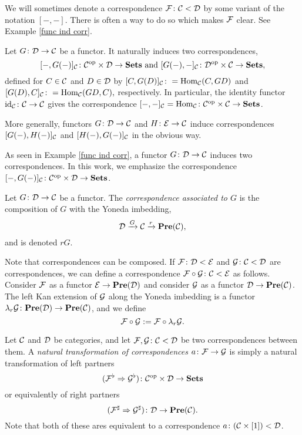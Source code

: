 \documentclass[10pt]{amsart}
\begin{document}
We will sometimes denote a correspondence $\mathcal{F}\colon \mathcal{C}<\mathcal{D}$ by some variant of the notation $[-,-]$.  There is often
a way to do so which makes $\mathcal{F}$ clear.  See Example \ref{func ind corr}.

\begin{example}\label{func ind corr}

Let $G\colon \mathcal{D}\rightarrow\mathcal{C}$ be a functor.  It naturally induces two correspondences, $$[-,G(-)]_\mathcal{C}\colon \mathcal{C}^\textnormal{op}\times\mathcal{D}\rightarrow{\bf Sets} \textnormal{  and
} [G(-),-]_\mathcal{C}\colon \mathcal{D}^\textnormal{op}\times\mathcal{C}\rightarrow{\bf Sets},$$ defined for $C\in\mathcal{C}$ and $D\in\mathcal{D}$ by $[C,G(D)]_\mathcal{C}\colon =\textnormal{Hom}_\mathcal{C}(C,GD)$ and
$[G(D),C]_\mathcal{C}\colon =\textnormal{Hom}_\mathcal{C}(GD,C),$ respectively.  In
particular, the identity functor $\textnormal{id}_\mathcal{C}\colon \mathcal{C}\rightarrow\mathcal{C}$ gives the correspondence $[-,-]_\mathcal{C}=\textnormal{Hom}_\mathcal{C}\colon \mathcal{C}^\textnormal{op}\times\mathcal{C}\rightarrow{\bf Sets}$.

More generally, functors $G\colon \mathcal{D}\rightarrow\mathcal{C}$ and $H\colon \mathcal{E}\rightarrow\mathcal{C}$ induce correspondences $[G(-),H(-)]_\mathcal{C}$ and
$[H(-),G(-)]_\mathcal{C}$ in the obvious way.

\end{example}

As seen in Example \ref{func ind corr}, a functor $G\colon \mathcal{D}\rightarrow\mathcal{C}$ induces two correspondences.  In this work, we emphasize the
correspondence $[-,G(-)]_\mathcal{C}\colon \mathcal{C}^\textnormal{op}\times\mathcal{D}\rightarrow{\bf Sets}$.

\begin{definition}

Let $G\colon \mathcal{D}\rightarrow\mathcal{C}$ be a functor.  The {\em correspondence associated to $G$} is the composition of $G$ with the Yoneda imbedding, $$\mathcal{D}\xrightarrow{G}\mathcal{C}\xrightarrow{r}{\bf Pre}(\mathcal{C}),$$ and is denoted $rG$.

\end{definition}

Note that correspondences can be composed.  If $\mathcal{F}\colon\mathcal{D}<\mathcal{E}$ and $\mathcal{G}\colon\mathcal{C}<\mathcal{D}$ are correspondences, we can define a correspondence $\mathcal{F}\circ\mathcal{G}\colon\mathcal{C}<\mathcal{E}$ as follows.  Consider $\mathcal{F}$ as a functor $\mathcal{E}\rightarrow{\bf Pre}(\mathcal{D})$ and consider $\mathcal{G}$ as a functor $\mathcal{D}\rightarrow{\bf Pre}(\mathcal{C})$.  The left Kan extension of $\mathcal{G}$ along the Yoneda imbedding is a functor $\lambda_r\mathcal{G}\colon{\bf Pre}(\mathcal{D})\rightarrow{\bf Pre}(\mathcal{C})$, and we define $$\mathcal{F}\circ\mathcal{G}:=\mathcal{F}\circ \lambda_r\mathcal{G}.$$

Let $\mathcal{C}$ and $\mathcal{D}$ be categories, and let $\mathcal{F},\mathcal{G}\colon\mathcal{C}<\mathcal{D}$ be two correspondences between them.  A {\em natural transformation of correspondences} $a\colon\mathcal{F}\rightarrow\mathcal{G}$ is simply a natural transformation of left partners  $$(\mathcal{F}^\flat\Rightarrow\mathcal{G}^\flat)\colon\mathcal{C}^\textnormal{op}\times\mathcal{D}\rightarrow{\bf Sets}$$ or equivalently of right partners $$(\mathcal{F}^\sharp\Rightarrow\mathcal{G}^\sharp)\colon\mathcal{D}\rightarrow{\bf Pre}(\mathcal{C}).$$  Note that both of these ares equivalent to a correspondence $a\colon(\mathcal{C}\times[1])<\mathcal{D}$.
\end{document}
